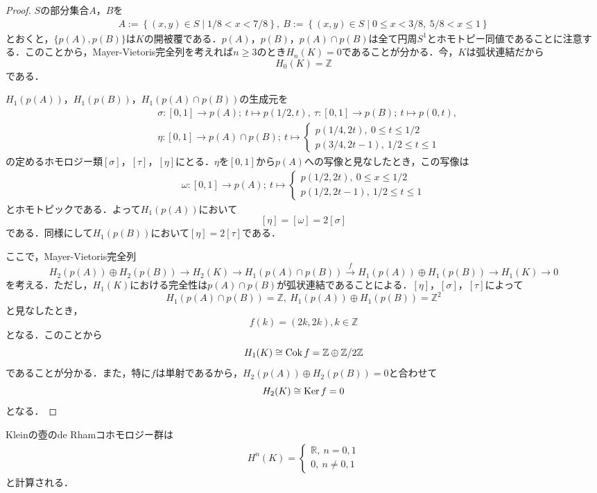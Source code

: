 \documentclass[uplatex]{jsarticle}
\begin{document}
\begin{proof}
  $S$の部分集合$A$，$B$を
  \begin{align*}
    A:=\left\{(x,y)\in S\mid 1/8< x< 7/8\right\},\ B:=\left\{(x,y)\in S\mid 0\leq x<3/8,\ 5/8<x\leq 1 \right\}
  \end{align*}
  とおくと，$\{p(A),p(B)\}$は$K$の開被覆である．$p(A)$，$p(B)$，$p(A)\cap p(B)$は全て円周$S^1$とホモトピー同値であることに注意する．このことから，Mayer-Vietoris完全列を考えれば$n\geq 3$のとき$H_n(K)=0$であることが分かる．今，$K$は弧状連結だから
  \[ H_0(K)=\mathbb{Z} \]
  である．

  $H_1(p(A))，H_1(p(B))，H_1(p(A)\cap p(B))$の生成元を
  \begin{align*}
     & \sigma\colon [0,1]\to p(A);\ t\mapsto p(1/2,t),\ \tau\colon [0,1]\to p(B);\ t\mapsto p(0,t), \\
     & \eta\colon [0,1]\to p(A)\cap p(B);\ t\mapsto
    \begin{cases}
      p(1/4,2t), \ 0\leq t\leq 1/2 \\
      p(3/4,2t-1), \ 1/2\leq t\leq 1
    \end{cases}
  \end{align*}
  の定めるホモロジー類$[\sigma]，[\tau]，[\eta]$にとる．$\eta$を$[0,1]$から$p(A)$への写像と見なしたとき，この写像は
  \begin{align*}
    \omega\colon [0,1]\to p(A);\ t\mapsto
    \begin{cases}
      p(1/2,2t),\ 0\leq x \leq 1/2 \\
      p(1/2,2t-1),\ 1/2\leq t\leq 1
    \end{cases}
  \end{align*}
  とホモトピックである．よって$H_1(p(A))$において
  \[ [\eta]=[\omega]=2[\sigma] \]
  である．同様にして$H_1(p(B))$において$[\eta]=2[\tau]$である．

  ここで，Mayer-Vietoris完全列
  \[ H_2(p(A))\oplus H_2(p(B))\to H_2(K)\to H_1(p(A)\cap p(B))\stackrel{f}{\to}  H_1(p(A))\oplus H_1(p(B))\to H_1(K)\to 0 \]
  を考える．ただし，$H_1(K)$における完全性は$p(A)\cap p(B)$が弧状連結であることによる．$[\eta]，[\sigma]，[\tau]$によって
  \[ H_1(p(A)\cap p(B))=\mathbb{Z},\  H_1(p(A))\oplus H_1(p(B))=\mathbb{Z}^2 \]
  と見なしたとき，
  \[ f(k)=(2k,2k), k\in \mathbb{Z} \]
  となる．このことから
  \[ H_1(K)\cong\operatorname{Cok} f=\mathbb{Z}\oplus \mathbb{Z}/2\mathbb{Z} \]
  であることが分かる．また，特に$f$は単射であるから，$H_2(p(A))\oplus H_2(p(B))=0$と合わせて
  \[ H_2(K)\cong\operatorname{Ker} f=0 \]
  となる．
\end{proof}
\begin{theorem}\label{de Rham}
  Kleinの壺のde Rhamコホモロジー群は
  \begin{eqnarray*}
    H^n(K)=
    \begin{cases}
      \mathbb{R},\ n=0,1 \\
      0, \ n\neq 0,1
    \end{cases}
  \end{eqnarray*}
  と計算される．
\end{theorem}
\end{document}
